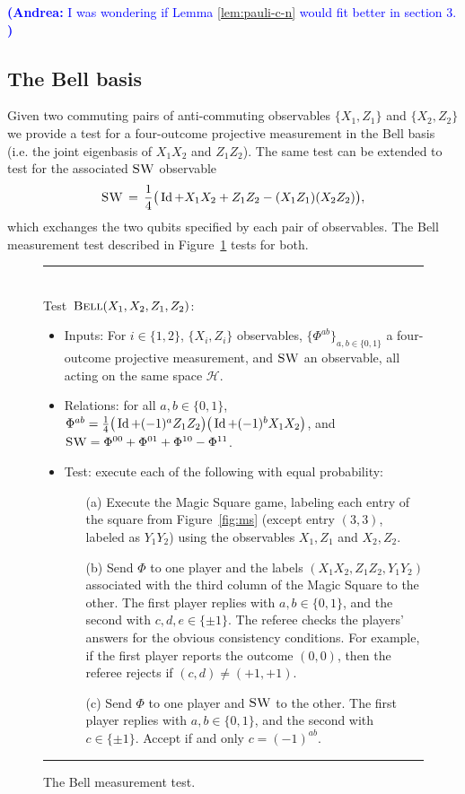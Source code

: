 \documentclass[11pt]{article}
\theoremstyle{remark}
\theoremstyle{definition}
\newcommand{\Id}{\ensuremath{\mathop{\rm Id}\nolimits}}
\newcommand{\mH}{\mathcal{H}}
\newcommand{\bellt}{\textsc{Bell}}
\newcommand{\SWAP}{\textsc{SW}}
\newcommand{\anote}[1]{\textcolor{blue}{\small {\textbf{(Andrea:} #1 \textbf{) }}}}
\begin{document}
\anote{I was wondering if Lemma \ref{lem:pauli-c-n} would fit better in section 3. }


\subsection{The Bell basis}
\label{sec:bell}

Given two commuting pairs of anti-commuting observables $\{X_1,Z_1\}$ and $\{X_2,Z_2\}$ we provide a test for a four-outcome projective measurement in the Bell basis (i.e. the joint eigenbasis of $X_1X_2$ and $Z_1Z_2$). The same test can be extended to test for the associated $\SWAP$ observable
\begin{equation}\label{eq:def-swap}
 \SWAP \,=\, \frac{1}{4} \big( \Id + X_1X_2 + Z_1Z_2 - (X_1Z_1)(X_2Z_2) \big),
\end{equation}
 which exchanges the two qubits specified by each pair of observables. The Bell measurement test described in Figure~\ref{fig:bell} tests for both. 


\begin{figure}[H]
\rule[1ex]{\textwidth}{0.5pt}\\
Test~$\bellt(X_1,X_2,Z_1,Z_2)$:
\begin{itemize}
    \item Inputs: For $i\in\{1,2\}$, $\{X_i,Z_i\}$ observables, $\{\Phi^{ab}\}_{a,b\in\{0,1\}}$ a four-outcome projective measurement, and $\SWAP$ an observable, all acting on the same space $\mH$.
    \item Relations: for all $a,b\in\{0,1\}$, $\Phi^{ab} = \frac{1}{4}\big(\Id+(-1)^a Z_1Z_2\big)\big(\Id+(-1)^bX_1X_2\big)$, and $\SWAP = \Phi^{00} + \Phi^{01} + \Phi^{10} - \Phi^{11}$.   
    \item Test: execute each of the following with equal probability:
		\begin{enumerate}
		\item[(a)] Execute the Magic Square game, labeling each entry of the square from Figure~\ref{fig:ms} (except entry $(3,3)$, labeled as $Y_1Y_2$) using the observables $X_1,Z_1$ and $X_2,Z_2$.
		\item[(b)] Send $\Phi$ to one player and the labels $(X_1X_2,Z_1Z_2,Y_1Y_2)$ associated with the third column of the Magic Square to the other.  The first player replies with $a,b\in\{0,1\}$, and the second with $c,d,e\in \{\pm 1\}$. The referee checks the players' answers for the obvious consistency conditions. For example, if the first player reports the outcome $(0,0)$, then the referee rejects if $(c,d)\neq (+1,+1)$. 
		\item[(c)] Send $\Phi$ to one player and $\SWAP$ to the other. The first player replies with $a,b\in\{0,1\}$, and the second with $c\in \{\pm 1\}$. Accept if and only $c=(-1)^{ab}$. 
		\end{enumerate}
\end{itemize}
\rule[2ex]{\textwidth}{0.5pt}\vspace{-1cm}
\caption{The Bell measurement test.}
\label{fig:bell}
\end{figure}
\end{document}
